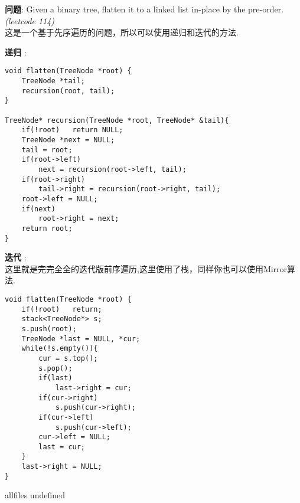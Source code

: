 \documentclass{article}
\begin{document}
\begin{CJK}{UTF8}{gbsn}     %

\else
	
\begin{description}
	\item{\textbf{问题}}: Given a binary tree, flatten it to a linked list in-place by the pre-order. \textit{(leetcode 114)}
	\\这是一个基于先序遍历的问题，所以可以使用递归和迭代的方法.
	\item{\textbf{递归}} : 
	\begin{lstlisting}
void flatten(TreeNode *root) {
	TreeNode *tail;
	recursion(root, tail);
}

TreeNode* recursion(TreeNode *root, TreeNode* &tail){
	if(!root)	return NULL;
	TreeNode *next = NULL;
	tail = root;
	if(root->left)
		next = recursion(root->left, tail);
	if(root->right)
		tail->right = recursion(root->right, tail);
	root->left = NULL;
	if(next)
		root->right = next;
	return root;
}
	\end{lstlisting}
	\item{\textbf{迭代}} : 
	\\这里就是完完全全的迭代版前序遍历,这里使用了栈，同样你也可以使用Mirror算法.
	\begin{lstlisting}
void flatten(TreeNode *root) {
	if(!root)	return;
	stack<TreeNode*> s;
	s.push(root);
	TreeNode *last = NULL, *cur;
	while(!s.empty()){
		cur = s.top();
		s.pop();
		if(last)
			last->right = cur;
		if(cur->right)
			s.push(cur->right);
		if(cur->left)
			s.push(cur->left);
		cur->left = NULL;
		last = cur;
	}
	last->right = NULL;
}
	\end{lstlisting}
\end{description}

\fi

\ifx allfiles undefined
\end{CJK}
\end{document}
